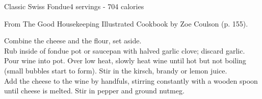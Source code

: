 \begin{recipe}{Classic Swiss Fondue}{4 servings - 704 calories}{}

\freeform From {\normalfont The Good Housekeeping Illustrated Cookbook} by Zoe Coulson (p. 155).


Combine the cheese and the flour, set aside.\\

Rub inside of fondue pot or saucepan with halved garlic clove; discard garlic.\\

Pour wine into pot. Over low heat, slowly heat wine until hot but not boiling (small bubbles start to form). Stir in the kirsch, brandy or lemon juice.\\ 

Add the cheese to the wine by handfuls, stirring constantly with a wooden spoon until cheese is melted. Stir in pepper and ground nutmeg.

\end{recipe}